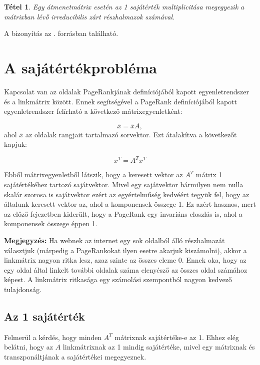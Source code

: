 \documentclass[12pt,a4paper]{article}
\newtheorem{tetel}{Tétel}
\begin{document}
\begin{tetel}
	Egy átmenetmátrix esetén az 1 sajátérték multiplicitása megegyezik a mátrixban lévő irreducibilis zárt részhalmazok számával.
\end{tetel}

A bizonyítás az \cite{irreducible_closed}. forrásban található.

\section{A sajátértékprobléma}

Kapcsolat van az oldalak PageRankjának definíciójából kapott egyenletrendszer és a linkmátrix között. Ennek segítségével a PageRank definíciójából kapott egyenletrendszer felírható a következő mátrixegyenletként:

\[ \bar{x} = \bar{x} A, \]
ahol $\bar{x}$ az oldalak rangjait tartalmazó sorvektor. Ezt átalakítva a következőt kapjuk:

\[ \bar{x}^T = A^T \bar{x}^T \]

Ebből mátrixegyenletből látszik, hogy a keresett vektor az $A^T$ mátrix 1 sajátértékéhez tartozó sajátvektor. Mivel egy sajátvektor bármilyen nem nulla skalár szorosa is sajátvektor ezért az egyértelműség kedvéért tegyük fel, hogy az általunk keresett vektor az, ahol a komponensek összege 1. Ez azért hasznos, mert az előző fejezetben kiderült, hogy a PageRank egy invariáns eloszlás is, ahol a komponensek összege éppen 1.

\vspace{0.1cm}
\textbf{Megjegyzés:} Ha webnek az internet egy sok oldalból álló részhalmazát választjuk (márpedig a PageRankokat ilyen esetre akarjuk kiszámolni), akkor a linkmátrix nagyon ritka lesz, azaz szinte az összes eleme 0. Ennek oka, hogy az egy oldal által linkelt további oldalak száma elenyésző az összes oldal számához képest. A linkmátrix ritkasága egy számolási szempontból nagyon kedvező tulajdonság. 

\subsection{Az 1 sajátérték}\label{egy_sajatertek}

Felmerül a kérdés, hogy minden $A^T$ mátrixnak sajátértéke-e az 1. Ehhez elég belátni, hogy az $A$ linkmátrixnak az 1 mindig sajátértéke, mivel egy mátrixnak és transzponáltjának a sajátértékei megegyeznek.
\end{document}
